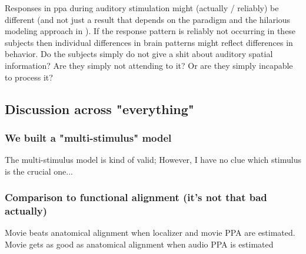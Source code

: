 

%
Responses in \ac{ppa} during auditory stimulation might (actually / reliably) be
different (and not just a result that depends on the paradigm and the hilarious
modeling approach in \citet{haeusler2022processing}).
%
If the response pattern is reliably not occurring in these subjects then
individual differences in brain patterns might reflect differences in behavior.
%
Do the subjects simply do not give a shit about auditory spatial information?
%
Are they simply not attending to it? Or are they simply incapable to process it?




\subsection{Discussion across "everything"}



\subsubsection{We built a "multi-stimulus" model}




The multi-stimulus model is kind of valid;
%
However, I have no clue which stimulus is the crucial one...


\subsubsection{Comparison to functional alignment (it's not that bad actually)}

%
Movie beats anatomical alignment when localizer and movie PPA are estimated.
%
Movie gets as good as anatomical alignment when audio PPA is estimated

